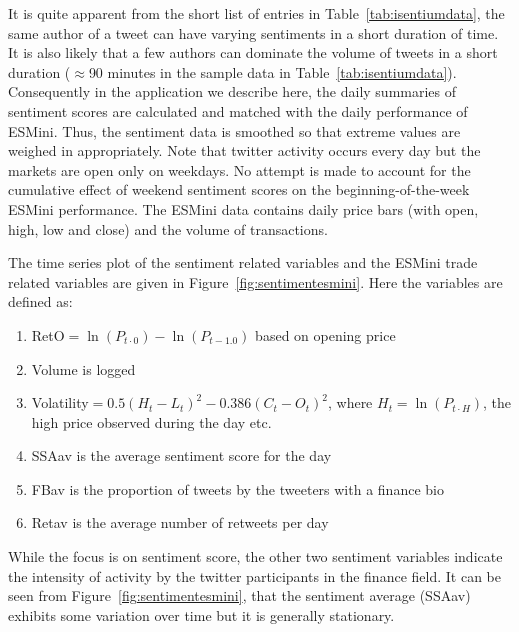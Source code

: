 It is quite apparent from the short list of entries in Table~\ref{tab:isentiumdata}, the same author of a tweet can have varying sentiments in a short duration of time. It is also likely that a few authors can dominate the volume of tweets in a short duration ($\approx$90 minutes in the sample data in Table~\ref{tab:isentiumdata}). Consequently in the application we describe here, the daily summaries of sentiment scores are calculated and matched with the daily performance of ESMini. Thus, the sentiment data is smoothed so that extreme values are weighed in appropriately. Note that twitter activity occurs every day but the markets are open only on weekdays. No attempt is made to account for the cumulative effect of weekend sentiment scores on the beginning-of-the-week ESMini performance. The ESMini data contains daily price bars (with open, high, low and close) and the volume of transactions.


The time series plot of the sentiment related variables and the ESMini trade related variables are given in Figure~\ref{fig:sentimentesmini}. Here the variables are defined as:
        \begin{enumerate}[--]
        \item RetO$=\ln(P_{t \cdot 0}) - \ln(P_{t-1.0})$ based on opening price
        \item Volume is logged
        \item Volatility$= 0.5(H_t-L_t)^2 - 0.386(C_t-O_t)^2$, where $H_t=\ln(P_{t \cdot H})$, the high price observed during the day etc.
        \item SSAav is the average sentiment score for the day
        \item FBav is the proportion of tweets by the tweeters with a finance bio
        \item Retav is the average number of retweets per day 
        \end{enumerate}
While the focus is on sentiment score, the other two sentiment variables indicate the intensity of activity by the twitter participants in the finance field. It can be seen from Figure~\ref{fig:sentimentesmini}, that the sentiment average (SSAav) exhibits some variation over time but it is generally stationary. 

